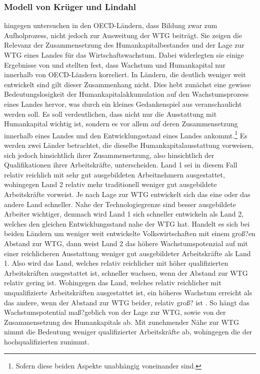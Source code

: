 \subsubsection*{Modell von Krüger und Lindahl}
\cite{Krueger.2001} hingegen untersuchen in den OECD-Ländern, dass Bildung zwar zum Aufholprozess, nicht jedoch zur Ausweitung der WTG beiträgt.
Sie zeigen die Relevanz der Zusammensetzung des Humankapitalbestandes und der Lage zur WTG eines Landes für das Wirtschaftswachstum. Dabei widerlegten sie einige Ergebnisse von \cite{Benhabib.1994} und stellten fest, dass Wachstum und Humankapital nur innerhalb von OECD-Ländern korreliert. In Ländern, die deutlich weniger weit entwickelt sind gilt dieser Zusammenhang nicht. Dies hebt zunächst eine gewisse Bedeutungslosigkeit der Humankapitalakkumulation auf den Wachstumsprozess eines Landes hervor, was durch ein kleines Gedankenspiel aus \cite{Krueger.2001} veranschaulicht werden soll. Es soll verdeutlichen, dass nicht nur die Ausstattung mit Humankapital wichtig ist, sondern es vor allem auf deren Zusammensetzung innerhalb eines Landes und den Entwicklungsstand eines Landes ankommt.\footnote{Sofern diese beiden Aspekte unabhängig voneinander sind.} Es werden zwei Länder betrachtet, die dieselbe Humankapitalausstattung vorweisen, sich jedoch hinsichtlich ihrer Zusammensetzung, also hinsichtlich der Qualifikationen ihrer Arbeitskräfte, unterscheiden. Land 1 sei in diesem Fall relativ reichlich mit sehr gut ausgebildeten Arbeitnehmern ausgestattet, wohingegen Land 2 relativ mehr traditionell weniger gut ausgebildete Arbeitskräfte vorweist. Je nach Lage zur WTG entwickelt sich das eine oder das andere Land schneller. Nahe der Technologiegrenze sind besser ausgebildete Arbeiter wichtiger, demnach wird Land 1 sich schneller entwickeln als Land 2, welches den gleichen Entwicklungsstand nahe der WTG hat. Handelt es sich bei beiden Ländern um weniger weit entwickelte Volkswirtschaften mit einem groß?en Abstand zur WTG, dann weist Land 2 das höhere Wachstumspotenzial auf mit einer reichlicheren Ausstattung weniger gut ausgebildeter Arbeitskräfte als Land 1. Also wird das Land, welches relativ reichlicher mit höher qualifizierten Arbeitskräften ausgestattet ist, schneller wachsen, wenn der Abstand zur WTG relativ gering ist. Wohingegen das Land, welches relativ reichlicher mit unqualifizierte Arbeitskräften ausgestattet ist, ein höheres Wachstum erreicht als das andere, wenn der Abstand zur WTG beider, relativ groß? ist \cite{Krueger.2001}. So hängt das Wachstumspotential maß?geblich von der Lage zur WTG, sowie von der Zusammensetzung des Humankapitals ab. Mit zunehmender Nähe zur WTG nimmt die Bedeutung weniger qualifizierter Arbeitskräfte ab, wohingegen die der hochqualifizierten zunimmt.\\
